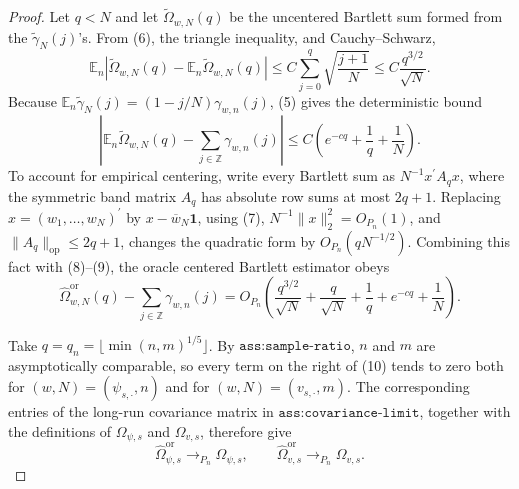 \documentclass{article}
\begin{document}
\begin{proof}
Let \(q<N\) and let \(\widetilde\Omega_{w,N}(q)\) be the uncentered Bartlett sum formed from the \(\widetilde\gamma_N(j)\)'s.  From (6), the triangle inequality, and Cauchy--Schwarz,
\[
 \mathbb E_n\left|
 \widetilde\Omega_{w,N}(q)-\mathbb E_n\widetilde\Omega_{w,N}(q)
 \right|
 \leq C\sum_{j=0}^q\sqrt{\frac{j+1}{N}}
 \leq C\frac{q^{3/2}}{\sqrt N}.                                                     \tag{8}
\]
Because \(\mathbb E_n\widetilde\gamma_N(j)=(1-j/N)\gamma_{w,n}(j)\), (5) gives the deterministic bound
\[
 \left|
 \mathbb E_n\widetilde\Omega_{w,N}(q)
 -\sum_{j\in\mathbb Z}\gamma_{w,n}(j)
 \right|
 \leq C\left(e^{-cq}+\frac1q+\frac1N\right).                                      \tag{9}
\]
To account for empirical centering, write every Bartlett sum as \(N^{-1}x^{\prime}A_qx\), where the symmetric band matrix \(A_q\) has absolute row sums at most \(2q+1\).  Replacing \(x=(w_1,\ldots,w_N)^{\prime}\) by \(x-\overline w_N\mathbf 1\), using (7), \(N^{-1}\lVert x\rVert_2^2=O_{P_n}(1)\), and \(\lVert A_q\rVert_{\mathrm{op}}\leq2q+1\), changes the quadratic form by \(O_{P_n}(qN^{-1/2})\).  Combining this fact with (8)--(9), the oracle centered Bartlett estimator obeys
\[
 \widehat\Omega^{\mathrm{or}}_{w,N}(q)
 -\sum_{j\in\mathbb Z}\gamma_{w,n}(j)
 =O_{P_n}\left(
   \frac{q^{3/2}}{\sqrt N}+\frac q{\sqrt N}
   +\frac1q+e^{-cq}+\frac1N
 \right).                                                                           \tag{10}
\]

Take \(q=q_n=\lfloor\min(n,m)^{1/5}\rfloor\).  By \(\texttt{ass:sample-ratio}\), \(n\) and \(m\) are asymptotically comparable, so every term on the right of (10) tends to zero both for \((w,N)=(\psi_{s,\cdot},n)\) and for \((w,N)=(v_{s,\cdot},m)\).  The corresponding entries of the long-run covariance matrix in \(\texttt{ass:covariance-limit}\), together with the definitions of \(\Omega_{\psi,s}\) and \(\Omega_{v,s}\), therefore give
\[
 \widehat\Omega^{\mathrm{or}}_{\psi,s}\to_{P_n}\Omega_{\psi,s},
 \qquad
 \widehat\Omega^{\mathrm{or}}_{v,s}\to_{P_n}\Omega_{v,s}.                        \tag{11}
\]


\end{proof}
\end{document}
